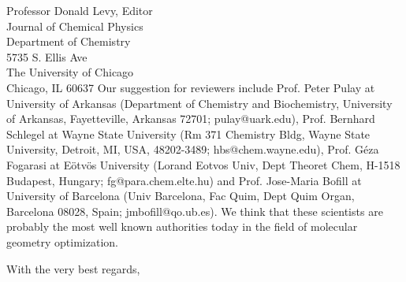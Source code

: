 \begin{letter}{
Professor Donald Levy, Editor\\
Journal of Chemical Physics\\
Department of Chemistry\\
5735 S. Ellis Ave\\
The University of Chicago\\
Chicago, IL 60637}
Our suggestion for reviewers include
Prof. Peter Pulay at University of Arkansas (Department of Chemistry and Biochemistry, University of Arkansas, Fayetteville, Arkansas 72701; pulay@uark.edu),  
Prof. Bernhard Schlegel at Wayne State University (Rm 371 Chemistry 
Bldg, Wayne State University, Detroit, MI, USA, 48202-3489; 
\newline
hbs@chem.wayne.edu), 
Prof. G{\'e}za Fogarasi at E{\"o}tv{\"o}s University (Lorand Eotvos Univ, Dept Theoret Chem, H-1518 Budapest, Hungary; fg@para.chem.elte.hu) and 
Prof. Jose-Maria Bofill at University of \newline Barcelona (Univ Barcelona, Fac Quim, Dept Quim Organ, 
Barcelona 08028, Spain; jmbofill@qo.ub.es).
We think that these scientists are probably the most well known
authorities today in the field of molecular geometry optimization.

\closing{With the very best regards,}
\end{letter}


